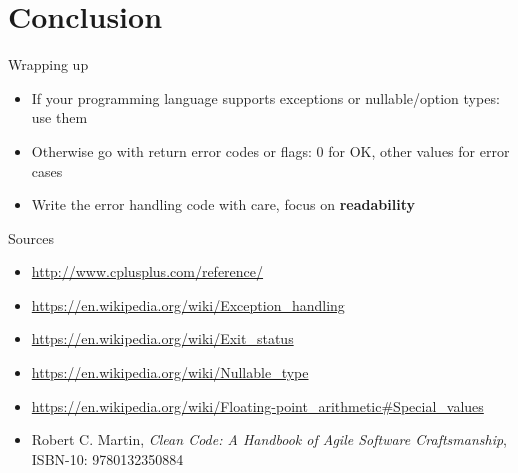 \documentclass[aspectratio=169,14pt]{beamer}
\begin{document}
\section{Conclusion}

\begin{frame}{Wrapping up}
\begin{itemize}
    \item If your programming language supports exceptions or nullable/option types: use them
    \item Otherwise go with return error codes or flags: 0 for OK, other values for error cases
    \item Write the error handling code with care, focus on \textbf{readability}
\end{itemize}
\end{frame}



\begin{frame}{Sources}
\begin{small}
    \begin{itemize}
        \item \url{http://www.cplusplus.com/reference/}
        \item \url{https://en.wikipedia.org/wiki/Exception_handling}
        \item \url{https://en.wikipedia.org/wiki/Exit_status}
        \item \url{https://en.wikipedia.org/wiki/Nullable_type}
        \item \url{https://en.wikipedia.org/wiki/Floating-point_arithmetic\#Special_values}
        \item Robert C. Martin, \textit{Clean Code: A Handbook of Agile Software Craftsmanship}, ISBN-10: 9780132350884 
    \end{itemize}
\end{small}
\end{frame}



\end{document}
